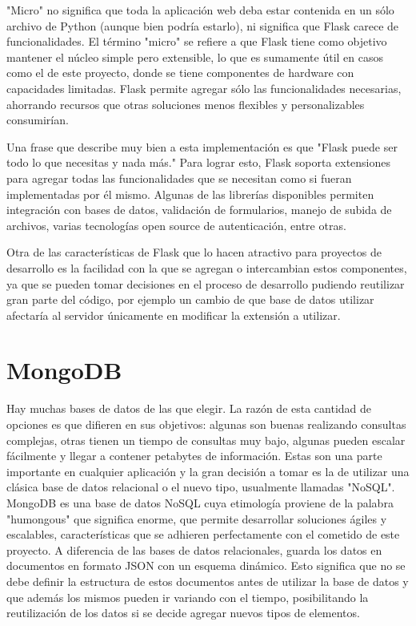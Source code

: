 "Micro" no significa que toda la aplicación web deba estar contenida en un sólo archivo de Python (aunque bien podría estarlo), ni significa que Flask carece de funcionalidades. El término "micro" se refiere a que Flask tiene como objetivo mantener el núcleo simple pero extensible, lo que es sumamente útil en casos como el de este proyecto, donde se tiene componentes de hardware con capacidades limitadas. Flask permite agregar sólo las funcionalidades necesarias, ahorrando recursos que otras soluciones menos flexibles y personalizables consumirían.

Una frase que describe muy bien a esta implementación es que "Flask puede ser todo lo que necesitas y nada más." 
Para lograr esto, Flask soporta extensiones para agregar todas las funcionalidades que se necesitan como si fueran implementadas por él mismo. Algunas de las librerías disponibles permiten integración con bases de datos, validación de formularios, manejo de subida de archivos, varias tecnologías open source de autenticación, entre otras.

Otra de las características de Flask que lo hacen atractivo para proyectos de desarrollo es la facilidad con la que se agregan o intercambian estos componentes, ya que se pueden tomar decisiones en el proceso de desarrollo pudiendo reutilizar gran parte del código, por ejemplo un cambio de que base de datos utilizar afectaría al servidor únicamente en modificar la extensión a utilizar.

\section{MongoDB}
Hay muchas bases de datos de las que elegir. La razón de esta cantidad de opciones es que difieren en sus objetivos: algunas son buenas realizando consultas complejas, otras tienen un tiempo de consultas muy bajo, algunas pueden escalar fácilmente y llegar a contener petabytes de información.
Estas son una parte importante en cualquier aplicación y la gran decisión a tomar es la de utilizar una clásica base de datos relacional o el nuevo tipo, usualmente llamadas "NoSQL".
MongoDB es una base de datos NoSQL cuya etimología proviene de la palabra "humongous" que significa enorme, que permite desarrollar soluciones ágiles y escalables, características que se adhieren perfectamente con el cometido de este proyecto.
A diferencia de las bases de datos relacionales, guarda los datos en documentos en formato JSON con un esquema dinámico. 
Esto significa que no se debe definir la estructura de estos documentos antes de utilizar la base de datos y que además los mismos pueden ir variando con el tiempo, posibilitando la reutilización de los datos si se decide agregar nuevos tipos de elementos.

